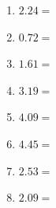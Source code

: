 \documentclass[12pt]{article}
\begin{document}
\begin{enumerate}
\item \large $ 2.24 = $ \vspace{1.5cm}
\item \large $ 0.72 = $ \vspace{1.5cm}
\item \large $ 1.61 = $ \vspace{1.5cm}
\item \large $ 3.19 = $ \vspace{1.5cm}
\item \large $ 4.09 = $ \vspace{1.5cm}
\item \large $ 4.45 = $ \vspace{1.5cm}
\item \large $ 2.53 = $ \vspace{1.5cm}
\item \large $ 2.09 = $ \vspace{1.5cm}
\end{enumerate}\newpage
\end{document}
